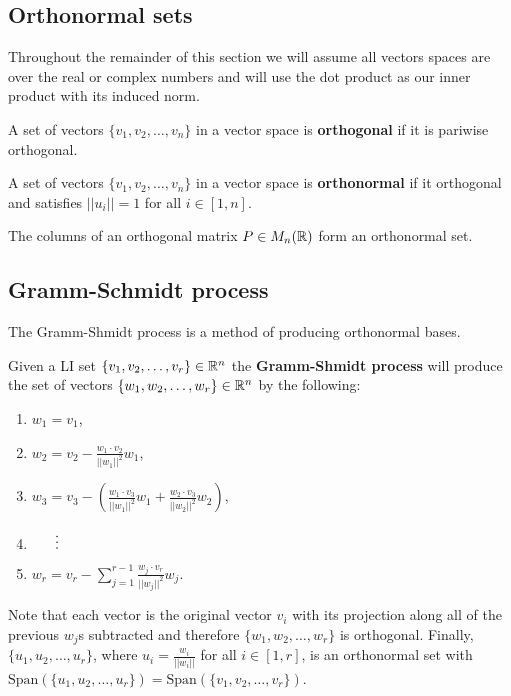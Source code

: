 \documentclass[../Year1/Year1.tex]{subfiles}
\begin{document}
\subsection{Orthonormal sets}
Throughout the remainder of this section we will assume all vectors spaces are over the real or complex numbers and will use the dot product as our inner product with its induced norm.

\begin{definition}
    A set of vectors $\{v_1,v_2,\ldots,v_n\}$ in a vector space is \textbf{orthogonal} if it is pariwise orthogonal.
\end{definition}

\begin{definition}
    A set of vectors $\{v_1,v_2,\ldots,v_n\}$ in a vector space is \textbf{orthonormal} if it orthogonal and satisfies $||u_i||=1$ for all $i\in[1,n]$.
\end{definition}

\begin{theorem}
    The columns of an orthogonal matrix $P\in M_n(\mathbb{R})$ form an orthonormal set.
\end{theorem}

\subsection{Gramm-Schmidt process}
The Gramm-Shmidt process is a method of producing orthonormal bases.
\begin{algorithm}
    Given a LI set $\{v_1,v_2,\ldots,v_r\} \in \mathbb{R}^n$ the \textbf{Gramm-Shmidt process} will produce the set of vectors $\{w_1,w_2,\ldots,w_r\} \in \mathbb{R}^n$ by the following:
    \begin{samepage}
    \begin{enumerate}
        \item[] $\displaystyle w_1 = v_1$,
        \item[] $\displaystyle w_2 = v_2 - \frac{w_1\cdot v_2}{||w_1||^2}w_1$,
        \item[] $\displaystyle w_3 = v_3 - \left(\frac{w_1\cdot v_3}{||w_1||^2}w_1 + \frac{w_2\cdot v_3}{||w_2||^2}w_2\right)$,
        \item[] $\hspace{16.5pt}\vdots$
        \item[] $\displaystyle w_r = v_r - \sum_{j=1}^{r-1}\frac{w_j\cdot v_r}{||w_j||^2}w_j$.
    \end{enumerate}
    \end{samepage}
    Note that each vector is the original vector $v_i$ with its projection along all of the previous $w_j$s subtracted and therefore $\{w_1,w_2,\ldots,w_r\}$ is orthogonal. Finally, $\{u_1,u_2,\ldots,u_r\}$, where $\displaystyle u_i = \frac{w_i}{||w_i||}$ for all $i\in[1,r]$, is an orthonormal set with $\text{Span}(\{u_1,u_2,\ldots,u_r\}) = \text{Span}(\{v_1,v_2,\ldots,v_r\})$.
\end{algorithm}
\end{document}
